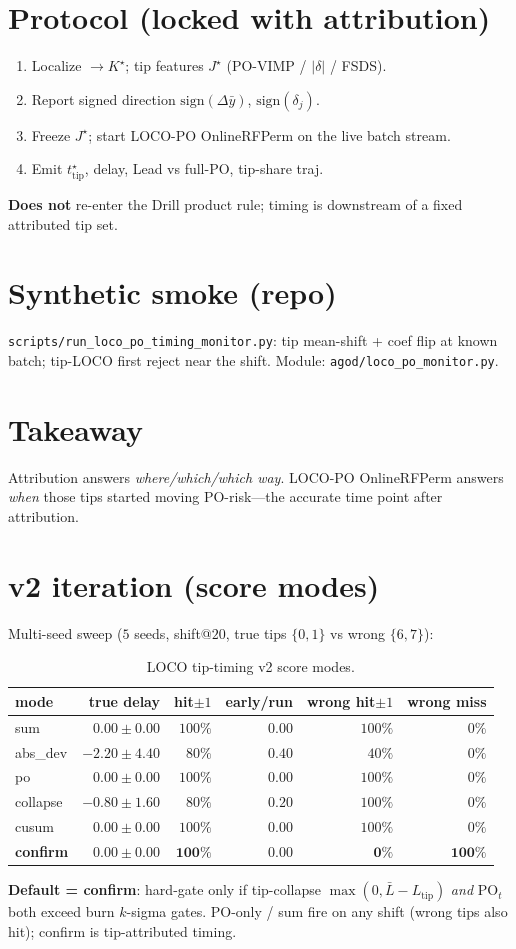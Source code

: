 \documentclass[11pt]{article}
\newcommand{\Jstar}{J^\star}
\begin{document}
\section{Protocol (locked with attribution)}
\begin{enumerate}[leftmargin=*,itemsep=0.35em]
  \item Localize $\to K^\star$; tip features $\Jstar$ (PO-VIMP / $|\delta|$ / FSDS).
  \item Report signed direction $\mathrm{sign}(\Delta\bar y)$, $\mathrm{sign}(\delta_j)$.
  \item Freeze $\Jstar$; start LOCO-PO OnlineRFPerm on the live batch stream.
  \item Emit $t^\star_{\mathrm{tip}}$, delay, Lead vs full-PO, tip-share traj.
\end{enumerate}
\textbf{Does not} re-enter the Drill product rule; timing is downstream
of a fixed attributed tip set.

\section{Synthetic smoke (repo)}
\texttt{scripts/run\_loco\_po\_timing\_monitor.py}: tip mean-shift +
coef flip at known batch; tip-LOCO first reject near the shift.
Module: \texttt{agod/loco\_po\_monitor.py}.

\section{Takeaway}
Attribution answers \emph{where/which/which way}.
LOCO-PO OnlineRFPerm answers \emph{when} those tips started moving
PO-risk---the accurate time point after attribution.


\section{v2 iteration (score modes)}
\label{sec:v2}
Multi-seed sweep ($5$ seeds, shift@$20$, true tips $\{0,1\}$ vs wrong $\{6,7\}$):

\begin{table}[h]
\centering
\caption{LOCO tip-timing v2 score modes.}
\label{tab:loco-v2}
\begin{tabular}{lrrrrr}
\toprule
mode & true delay & hit$\pm1$ & early/run & wrong hit$\pm1$ & wrong miss \\
\midrule
sum & $0.00\pm0.00$ & $100\%$ & $0.00$ & $100\%$ & $0\%$ \\
abs\_dev & $-2.20\pm4.40$ & $80\%$ & $0.40$ & $40\%$ & $0\%$ \\
po & $0.00\pm0.00$ & $100\%$ & $0.00$ & $100\%$ & $0\%$ \\
collapse & $-0.80\pm1.60$ & $80\%$ & $0.20$ & $100\%$ & $0\%$ \\
cusum & $0.00\pm0.00$ & $100\%$ & $0.00$ & $100\%$ & $0\%$ \\
\textbf{confirm} & $\mathbf{0.00\pm0.00}$ & $\mathbf{100\%}$ & $\mathbf{0.00}$ & $\mathbf{0\%}$ & $\mathbf{100\%}$ \\
\bottomrule
\end{tabular}
\end{table}

\textbf{Default = confirm}: hard-gate only if tip-collapse
$\max(0,\bar L-L_{\mathrm{tip}})$ \emph{and} $\mathrm{PO}_t$ both exceed
burn $k$-sigma gates. PO-only / sum fire on any shift (wrong tips also hit);
confirm is tip-attributed timing.
\end{document}
